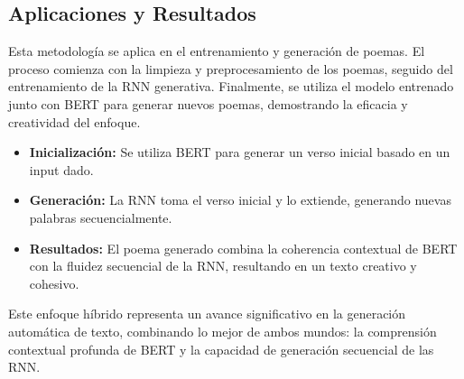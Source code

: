 \subsection{Aplicaciones y Resultados}
Esta metodología se aplica en el entrenamiento y generación de poemas. El proceso comienza con la limpieza y preprocesamiento de los poemas, seguido del entrenamiento de la RNN generativa. Finalmente, se utiliza el modelo entrenado junto con BERT para generar nuevos poemas, demostrando la eficacia y creatividad del enfoque.

\begin{itemize}
    \item \textbf{Inicialización:} Se utiliza BERT para generar un verso inicial basado en un input dado.
    \item \textbf{Generación:} La RNN toma el verso inicial y lo extiende, generando nuevas palabras secuencialmente.
    \item \textbf{Resultados:} El poema generado combina la coherencia contextual de BERT con la fluidez secuencial de la RNN, resultando en un texto creativo y cohesivo.
\end{itemize}

Este enfoque híbrido representa un avance significativo en la generación automática de texto, combinando lo mejor de ambos mundos: la comprensión contextual profunda de BERT y la capacidad de generación secuencial de las RNN.
